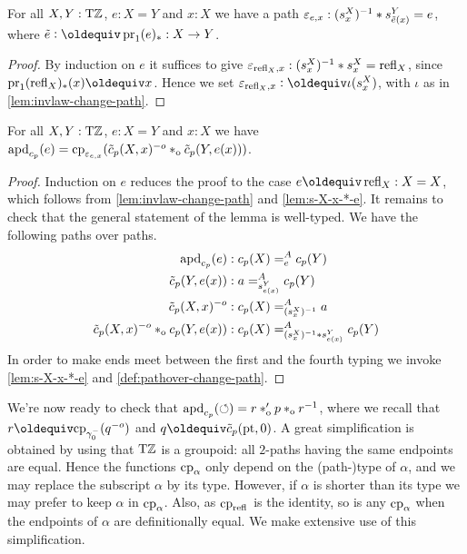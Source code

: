 \documentclass[a4paper,12pt]{amsart}
\begin{document}
\begin{lemma}\label{lem:s-X-x-*-e}
  For all $X,Y:{\mathrm{T}\mathbb{Z}}$, $e: X=Y$ and $x:X$ we have a path
  $\varepsilon_{e,x} : (s^X_x)^{-1} * s^Y_{\tilde {e}(x)} = e$,
  where $\ptoe{e}\defeq \pr_1(e)_* : X\to Y$.
\end{lemma}
\begin{proof}
By induction on $e$ it suffices to give
$\varepsilon_{\mathop{{\mathrm{refl}}_{X}},x} : (s^X_x)^{-1} * s^X_x = \mathop{{\mathrm{refl}}_{X}}$,
since $\pr_1(\refl{X})_*(x) \jdeq x$.
Hence we set $\varepsilon_{\refl{X},x} \defeq \iota(s^X_x)$,
with $\iota$ as in \cref{lem:invlaw-change-path}.
\end{proof}

\begin{lemma}\label{lem:apd-c-tilde-c}
For all $X,Y:{\mathrm{T}\mathbb{Z}}$, $e: X=Y$ and $x:X$ we have
$\mathop{{\mathrm{apd}}_{c_p}}(e) = \mathrm{cp}_{\varepsilon_{e,x}}
(\tilde c_p(X,x)^{-o}*_{\mathrm{o}} \tilde c_p(Y,e(x)))$.
\end{lemma}
\begin{proof}
Induction on $e$ reduces the proof to the case $e\jdeq\refl{X}: X=X$,
which follows from \cref{lem:invlaw-change-path} and \cref{lem:s-X-x-*-e}.
It remains to check that the general statement of the lemma is well-typed.
We have the following paths over paths.
\begin{align*}
\mathop{{\mathrm{apd}}_{c_p}}(e) &: c_p(X) =^A_e c_p(Y)\\
\tilde c_p(Y,e(x)) &:  a =^A_{s^Y_{e(x)}} c_p(Y)\\
\tilde c_p(X,x)^{-o} &: c_p(X) =^A_{(s^X_x)^{-1}} a\\
\tilde c_p(X,x)^{-o} *_{\mathrm{o}} c_p(Y,e(x)) &:
     c_p(X) =^A_{(s^X_x)^{-1}* s^Y_{e(x)}} c_p(Y)
\end{align*}
In order to make ends meet between the first and the fourth typing
we invoke \cref{lem:s-X-x-*-e} and \cref{def:pathover-change-path}.
\end{proof}

We're now ready to check that $\mathop{{\mathrm{apd}}_{c_p}}({\circlearrowleft}) = r *_{\mathrm{o}}' p *_{\mathrm{o}} r^{-1}$,
where we recall that $r\jdeq\cp{\gamma_0^-}(q^{-o})$ and $q\jdeq\tilde c_p(\pt,0)$.
A great simplification is obtained by using that ${\mathrm{T}\mathbb{Z}}$ is a groupoid:
all $2$-paths having the same endpoints are equal.
Hence the functions $\mathrm{cp}_{\alpha}$ only depend on the (path-)type
of $\alpha$, and we may replace the subscript $\alpha$ by its type.
However, if $\alpha$ is shorter than its type we may
prefer to keep $\alpha$ in $\mathrm{cp}_{\alpha}$.
Also, as $\mathrm{cp}_{\mathop{{\mathrm{refl}}_{}}}$ is the identity, so is any $\mathrm{cp}_{\alpha}$
when the endpoints of $\alpha$ are definitionally equal.
We make extensive use of this simplification.
\end{document}
